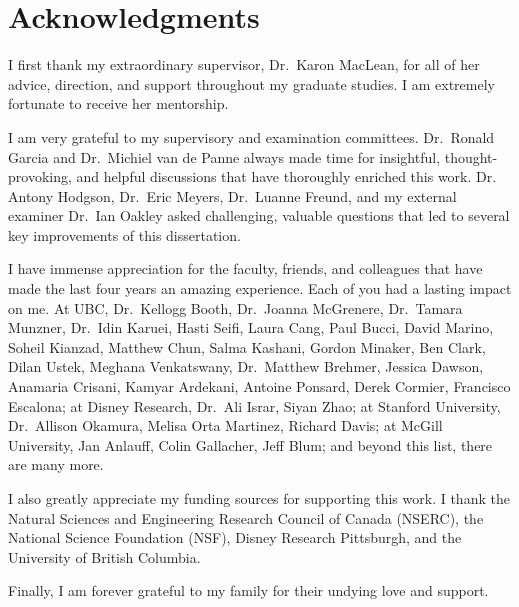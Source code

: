 
\chapter{Acknowledgments}

I first thank my extraordinary supervisor, Dr.~Karon MacLean, for all of her advice, direction, and support throughout my graduate studies.
I am extremely fortunate to receive her mentorship.

I am very grateful to my supervisory and examination committees. Dr.~Ronald Garcia and Dr.~Michiel van de Panne always made time for insightful, thought-provoking, and helpful discussions that have thoroughly enriched this work.
Dr. Antony Hodgson, Dr.~Eric Meyers, Dr.~Luanne Freund, and my external examiner Dr.~Ian Oakley asked challenging, valuable questions that led to several key improvements of this dissertation.

I have immense appreciation for the faculty, friends, and colleagues that have made the last four years an amazing experience.
Each of you had a lasting impact on me.
At UBC, Dr.~Kellogg Booth, Dr.~Joanna McGrenere, Dr.~Tamara Munzner,
Dr.~Idin Karuei, Hasti Seifi, Laura Cang, Paul Bucci,  David Marino, Soheil Kianzad, Matthew Chun, Salma Kashani, Gordon Minaker, Ben Clark, Dilan Ustek, Meghana Venkatswany, Dr.~Matthew Brehmer, Jessica Dawson, Anamaria Crisani, Kamyar Ardekani, Antoine Ponsard, Derek Cormier, Francisco Escalona;
at Disney Research, Dr.~Ali Israr, Siyan Zhao; 
at Stanford University, Dr.~Allison Okamura, Melisa Orta Martinez, Richard Davis;
at McGill University, Jan Anlauff, Colin Gallacher, Jeff Blum;
and beyond this list, there are many more.

I also greatly appreciate my funding sources for supporting this work.
I thank the Natural Sciences and Engineering Research Council of Canada (NSERC), the National Science Foundation (NSF), Disney Research Pittsburgh, and the University of British Columbia.

Finally, I am forever grateful to my family for their undying love and support.
